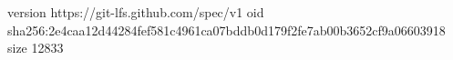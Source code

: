 version https://git-lfs.github.com/spec/v1
oid sha256:2e4caa12d44284fef581c4961ca07bddb0d179f2fe7ab00b3652cf9a06603918
size 12833
